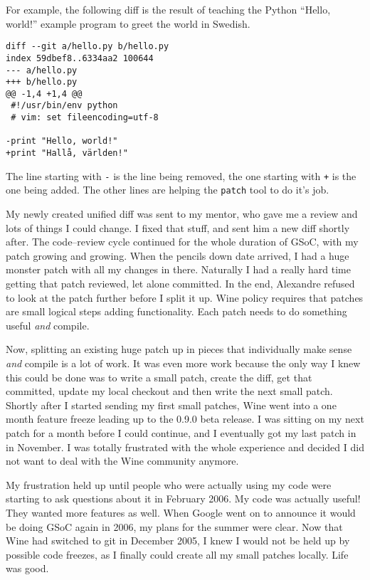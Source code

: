 For example, the following diff is the result of teaching the Python ``Hello,
world!'' example program to greet the world in Swedish.

\begin{verbatim}
diff --git a/hello.py b/hello.py
index 59dbef8..6334aa2 100644
--- a/hello.py
+++ b/hello.py
@@ -1,4 +1,4 @@
 #!/usr/bin/env python
 # vim: set fileencoding=utf-8

-print "Hello, world!"
+print "Hallå, världen!"
\end{verbatim}

The line starting with \texttt{-} is the line being removed, the one starting
with \texttt{+} is the one being added. The other lines are helping the
\texttt{patch} tool to do it's job.

My newly created unified diff was sent to my mentor, who gave me a review and
lots of things I could change. I fixed that stuff, and sent him a new diff
shortly after. The code--review cycle continued for the whole duration of GSoC,
with my patch growing and growing. When the pencils down date arrived, I had
a huge monster patch with all my changes in there. Naturally I had a really hard
time getting that patch reviewed, let alone committed. In the end, Alexandre
refused to look at the patch further before I split it up. Wine policy requires
that patches are small logical steps adding functionality. Each patch needs to
do something useful \emph{and} compile.

Now, splitting an existing huge patch up in pieces that individually make sense
\emph{and} compile is a lot of work. It was even more work because the only way
I knew this could be done was to write a small patch, create the diff, get that
committed, update my local checkout and then write the next small patch. Shortly
after I started sending my first small patches, Wine went into a one month
feature freeze leading up to the 0.9.0 beta release. I was sitting on my next
patch for a month before I could continue, and I eventually got my last patch in
in November. I was totally frustrated with the whole experience and decided I
did not want to deal with the Wine community anymore.

My frustration held up until people who were actually using my code were
starting to ask questions about it in February 2006. My code was actually
useful! They wanted more features as well. When Google went on to announce it
would be doing GSoC again in 2006, my plans for the summer were clear. Now that
Wine had switched to git in December 2005, I knew I would not be held up by
possible code freezes, as I finally could create all my small patches locally.
Life was good.

